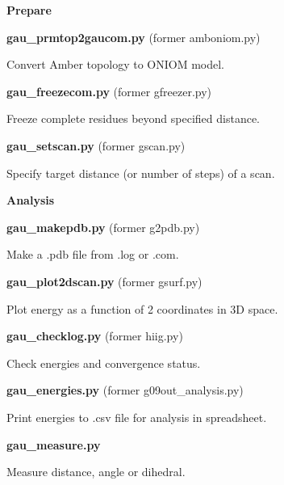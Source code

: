 \documentclass[11pt,a4paper]{article}
\begin{document}
\textbf{Prepare}

\noindent
\hrulefill

\vspace{3mm}

\textbf{gau\_prmtop2gaucom.py} (former amboniom.py)

\noindent
Convert Amber topology to ONIOM model.

\vspace{3mm}

\textbf{gau\_freezecom.py} (former gfreezer.py)

\noindent
Freeze complete residues beyond specified distance.

\vspace{3mm}

\textbf{gau\_setscan.py} (former gscan.py)

\noindent
Specify target distance (or number of steps) of a scan.


\vspace{9mm}

\textbf{Analysis}

\noindent
\hrulefill

\vspace{3mm}

\textbf{gau\_makepdb.py} (former g2pdb.py)

\noindent
Make a .pdb file from .log or .com.

\vspace{3mm}

\textbf{gau\_plot2dscan.py} (former gsurf.py)

\noindent
Plot energy as a function of 2 coordinates in 3D space.

\vspace{3mm}

\textbf{gau\_checklog.py} (former hiig.py)

\noindent
Check energies and convergence status.

\vspace{3mm}

\textbf{gau\_energies.py} (former g09out\_analysis.py)

\noindent
Print energies to .csv file for analysis in spreadsheet.

\vspace{3mm}

\textbf{gau\_measure.py}

\noindent
Measure distance, angle or dihedral.

\vspace{9mm}
\end{document}
